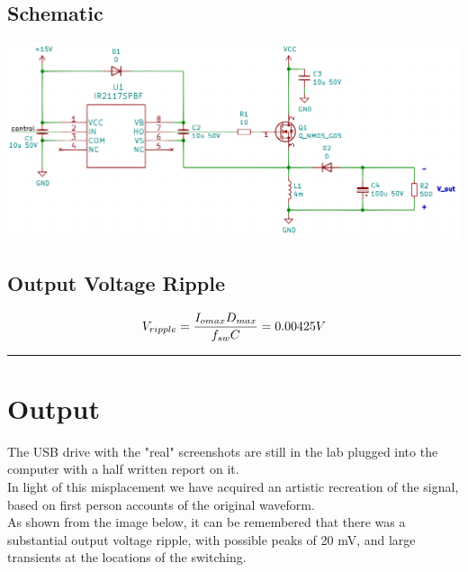 \documentclass[a4paper,11pt]{article}
\begin{document}
\begin{preview}
        \subsection*{Schematic}
        \begin{center}
            \includegraphics[width=1\textwidth]{schematic.png}
        \end{center}
        \subsection*{Output Voltage Ripple}
            $$V_{ripple}=\frac{I_{omax}D_{max}}{f_{sw}C}=0.00425V\\$$
      
\hrule

    \section{Output}
    The USB drive with the "real" screenshots are still in the lab plugged into the computer with a half written report on it. \\

    In light of this misplacement we have acquired an artistic recreation of the signal, based on first person accounts of the original waveform.\\

    As shown from the image below, it can be remembered that there was a substantial output voltage ripple, with possible peaks of 20 mV, and large transients at the locations of the switching.


\end{preview}
\end{document}
